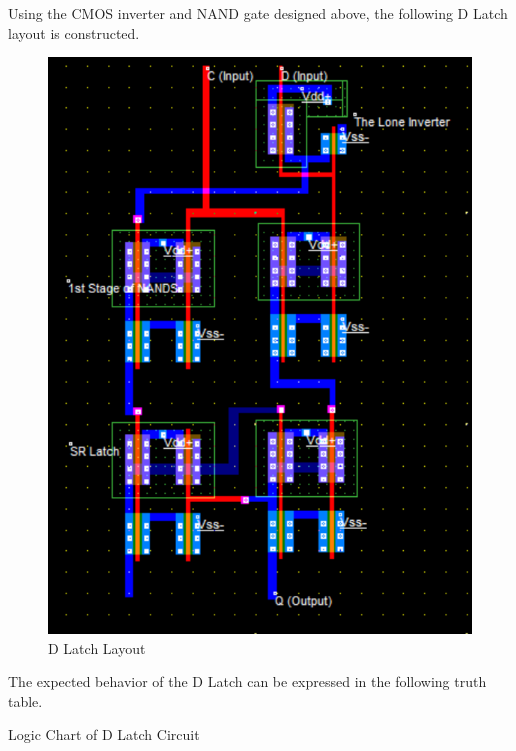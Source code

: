 \FloatBarrier

Using the CMOS inverter and NAND gate designed above, the following D Latch layout is constructed.

\FloatBarrier

\begin{figure}[h!]
	\centering
	\includegraphics[scale=0.70]{../images/dlatch_layout.PNG}
	\caption{D Latch Layout}
	\label{fig:dlatch_layout}
\end{figure}

\FloatBarrier

The expected behavior of the D Latch can be expressed in the following truth table.

\FloatBarrier

\begin{table}[h!]
	\centering
	\caption{Logic Chart of D Latch Circuit}
	\label{tab:dlatch_logic}
\end{table}

